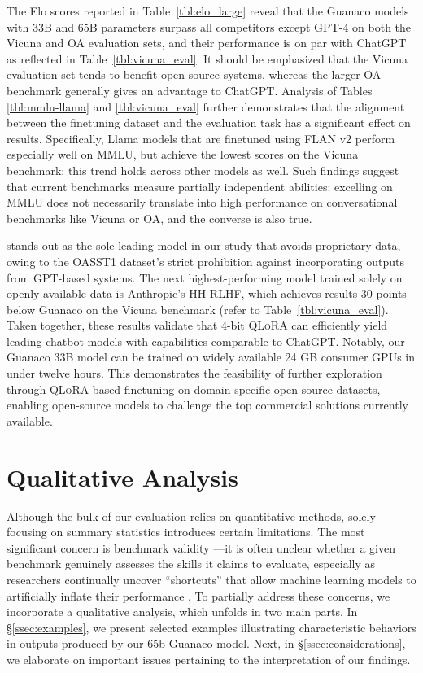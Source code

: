 The Elo scores reported in Table~\ref{tbl:elo_large} reveal that the {Guanaco} models with 33B and 65B parameters surpass all competitors except GPT-4 on both the Vicuna and OA evaluation sets, and their performance is on par with ChatGPT as reflected in Table~\ref{tbl:vicuna_eval}. It should be emphasized that the Vicuna evaluation set tends to benefit open-source systems, whereas the larger OA benchmark generally gives an advantage to ChatGPT. Analysis of Tables \ref{tbl:mmlu-llama} and \ref{tbl:vicuna_eval} further demonstrates that the alignment between the finetuning dataset and the evaluation task has a significant effect on results. Specifically, Llama models that are finetuned using FLAN v2 perform especially well on MMLU, but achieve the lowest scores on the Vicuna benchmark; this trend holds across other models as well. Such findings suggest that current benchmarks measure partially independent abilities: excelling on MMLU does not necessarily translate into high performance on conversational benchmarks like Vicuna or OA, and the converse is also true.

 stands out as the sole leading model in our study that avoids proprietary data, owing to the OASST1 dataset’s strict prohibition against incorporating outputs from GPT-based systems. The next highest-performing model trained solely on openly available data is Anthropic’s HH-RLHF, which achieves results 30 points below {Guanaco} on the Vicuna benchmark (refer to Table~\ref{tbl:vicuna_eval}). Taken together, these results validate that 4-bit \textsc{QLoRA} can efficiently yield leading chatbot models with capabilities comparable to ChatGPT. Notably, our {Guanaco} 33B model can be trained on widely available 24 GB consumer GPUs in under twelve hours. This demonstrates the feasibility of further exploration through \textsc{QLoRA}-based finetuning on domain-specific open-source datasets, enabling open-source models to challenge the top commercial solutions currently available.

\section{Qualitative Analysis}

Although the bulk of our evaluation relies on quantitative methods, solely focusing on summary statistics introduces certain limitations. The most significant concern is benchmark validity \citep{liao2021we}—it is often unclear whether a given benchmark genuinely assesses the skills it claims to evaluate, especially as researchers continually uncover ``shortcuts'' that allow machine learning models to artificially inflate their performance \citep{gururangan2018annotation, poliak2018hypothesis}. To partially address these concerns, we incorporate a qualitative analysis, which unfolds in two main parts. In \S\ref{ssec:examples}, we present selected examples illustrating characteristic behaviors in outputs produced by our 65b {Guanaco} model. Next, in \S\ref{ssec:considerations}, we elaborate on important issues pertaining to the interpretation of our findings.

